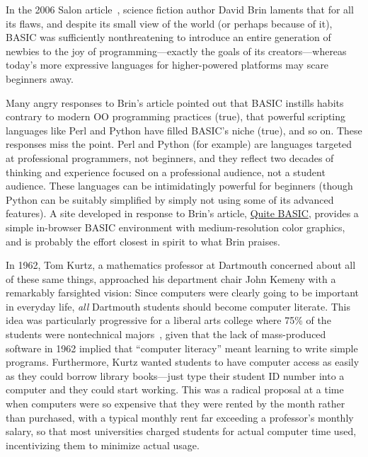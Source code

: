\begin{tangent}
In the 2006 Salon article~\cite{why_johnny_cant_code},
science fiction author David Brin laments that for all its flaws, and
despite its small view of the world (or perhaps because of it), BASIC
was sufficiently nonthreatening to introduce an entire generation of
newbies to the joy of programming---exactly the goals of its
creators---whereas today's more expressive languages for higher-powered
platforms may scare beginners away.

Many angry responses to Brin's article pointed out that BASIC
instills habits contrary to modern OO programming practices (true),
that powerful scripting languages like Perl and Python have filled BASIC's
niche (true), and so on.  These responses miss the point.  
Perl and Python (for example) are languages
targeted at professional programmers, not beginners, and they
reflect two decades of thinking and experience focused on a professional audience,
not a student audience.  These languages can be intimidatingly powerful
for beginners (though Python can be suitably simplified by simply
not using some of its advanced features).
A site developed in response to Brin's article, 
\href{http://quitebasic.com}{Quite BASIC}, provides a simple in-browser
BASIC environment with medium-resolution color graphics, and is probably
the effort closest in spirit to what Brin praises.
\end{tangent}

In 1962, Tom Kurtz, a mathematics professor at Dartmouth concerned
about all of these same things, approached
his department chair John Kemeny with a remarkably farsighted vision:
Since computers were clearly going to be important in everyday
life, \emph{all} Dartmouth students should become computer literate.  This idea
was
particularly progressive for a liberal arts college
where 75\% of the students were nontechnical majors~\cite{goto},
given that the lack of mass-produced software in 1962 implied that
``computer literacy'' meant learning to write simple programs.
Furthermore, Kurtz wanted students to have computer access as easily as
they could borrow library books---just type their student ID number into
a computer and they could start working.  This was a radical proposal at
a time when computers were so expensive that they were rented by the
month rather than purchased, with a typical monthly rent far
exceeding a professor's monthly salary, so that
most universities charged
students for actual 
computer time used,  incentivizing them to minimize actual
usage. 

